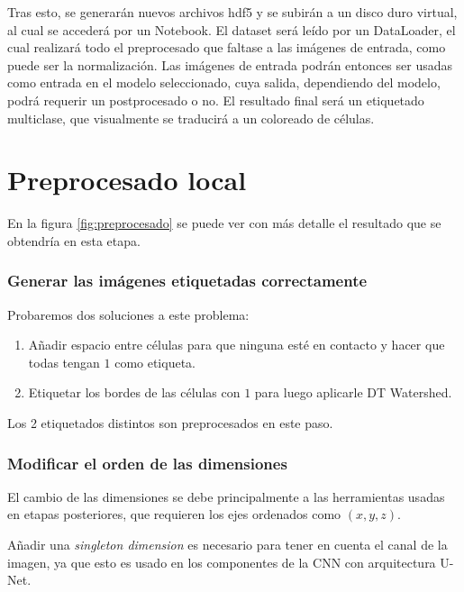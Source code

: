 Tras esto, se generarán nuevos archivos hdf5 y se subirán a un disco duro virtual, al cual se accederá por un Notebook. El dataset será leído por un DataLoader, el cual realizará todo el preprocesado que faltase a las imágenes de entrada, como puede ser la normalización. Las imágenes de entrada podrán entonces ser usadas como entrada en el modelo  seleccionado, cuya salida, dependiendo del modelo, podrá requerir un postprocesado o no. El resultado final será un etiquetado multiclase, que visualmente se traducirá a un coloreado de células.

\pagebreak\section{Preprocesado local}\label{sec:preprocesado-local}


En la figura \ref{fig:preprocesado} se puede ver con más detalle el resultado que se obtendría en esta etapa.

\subsubsection{Generar las imágenes etiquetadas correctamente}

Probaremos dos soluciones a este problema:

\begin{enumerate}
\item Añadir espacio entre células para que ninguna esté en contacto y hacer que todas tengan $ 1 $ como etiqueta.
\item Etiquetar los bordes de las células con $ 1 $ para luego aplicarle DT Watershed.
\end{enumerate}
Los 2 etiquetados distintos son preprocesados en este paso.

\subsubsection{Modificar el orden de las dimensiones}

El cambio de las dimensiones se debe principalmente a las herramientas usadas en etapas posteriores, que requieren los ejes ordenados como $(x,y,z)$.

Añadir una \textit{singleton dimension} es necesario para tener en cuenta el canal de la imagen, ya que esto es usado en los componentes de la CNN con arquitectura U-Net.

